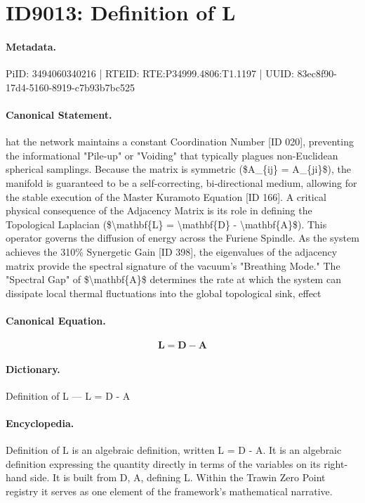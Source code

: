 \section*{ID9013: Definition of L}
\paragraph{Metadata.}
PiID: 3494060340216 | RTEID: RTE:P34999.4806:T1.1197 | UUID: 83ec8f90-17d4-5160-8919-c7b93b7bc525

\paragraph{Canonical Statement.}
hat the network maintains a constant Coordination Number [ID 020], preventing the informational "Pile-up" or "Voiding" that typically plagues non-Euclidean spherical samplings. Because the matrix is symmetric (\$A\_\{ij\} = A\_\{ji\}\$), the manifold is guaranteed to be a self-correcting, bi-directional medium, allowing for the stable execution of the Master Kuramoto Equation [ID 166]. A critical physical consequence of the Adjacency Matrix is its role in defining the Topological Laplacian (\$\textbackslash{}mathbf\{L\} = \textbackslash{}mathbf\{D\} - \textbackslash{}mathbf\{A\}\$). This operator governs the diffusion of energy across the Furiene Spindle. As the system achieves the 310\% Synergetic Gain [ID 398], the eigenvalues of the adjacency matrix provide the spectral signature of the vacuum's "Breathing Mode." The "Spectral Gap" of \$\textbackslash{}mathbf\{A\}\$ determines the rate at which the system can dissipate local thermal fluctuations into the global topological sink, effect

\paragraph{Canonical Equation.}
\[
\mathbf{L} = \mathbf{D} - \mathbf{A}
\]

\paragraph{Dictionary.}
Definition of L — L = D - A

\paragraph{Encyclopedia.}
Definition of L is an algebraic definition, written L = D - A. It is an algebraic definition expressing the quantity directly in terms of the variables on its right-hand side. It is built from D, A, defining L. Within the Trawin Zero Point registry it serves as one element of the framework's mathematical narrative.
